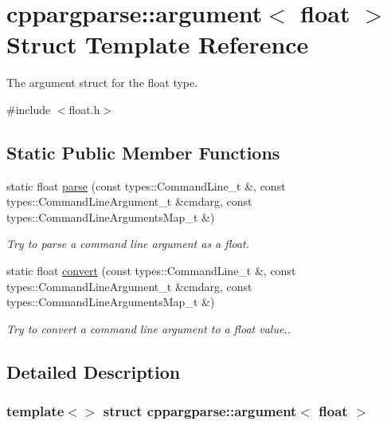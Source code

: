 \hypertarget{structcppargparse_1_1argument_3_01float_01_4}{}\section{cppargparse\+:\+:argument$<$ float $>$ Struct Template Reference}
\label{structcppargparse_1_1argument_3_01float_01_4}


The argument struct for the float type.  




{\ttfamily \#include $<$float.\+h$>$}

\subsection*{Static Public Member Functions}
\begin{DoxyCompactItemize}
\item 
static float \hyperlink{structcppargparse_1_1argument_3_01float_01_4_a425c616f08d003b24e510f826bb65215}{parse} (const types\+::\+Command\+Line\+\_\+t \&, const types\+::\+Command\+Line\+Argument\+\_\+t \&cmdarg, const types\+::\+Command\+Line\+Arguments\+Map\+\_\+t \&)
\begin{DoxyCompactList}\small\item\em Try to parse a command line argument as a float. \end{DoxyCompactList}\item 
static float \hyperlink{structcppargparse_1_1argument_3_01float_01_4_a9acfaf2335353a8b627831ed5a74b37b}{convert} (const types\+::\+Command\+Line\+\_\+t \&, const types\+::\+Command\+Line\+Argument\+\_\+t \&cmdarg, const types\+::\+Command\+Line\+Arguments\+Map\+\_\+t \&)
\begin{DoxyCompactList}\small\item\em Try to convert a command line argument to a float value.. \end{DoxyCompactList}\end{DoxyCompactItemize}


\subsection{Detailed Description}
\subsubsection*{template$<$$>$\newline
struct cppargparse\+::argument$<$ float $>$}

